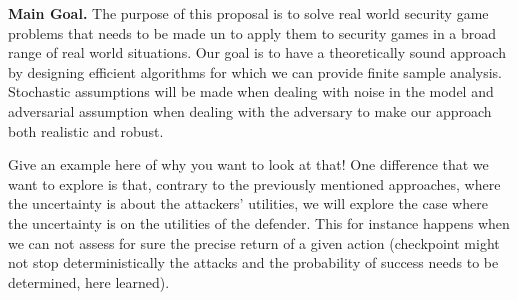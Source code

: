 

\textbf{Main Goal.} The purpose of this proposal is to solve real world security game problems that needs to be made un
to apply them to security games in a broad range of real world situations.
Our goal is to have a theoretically sound approach by designing efficient algorithms for which we can provide finite sample analysis.
Stochastic assumptions will be made when dealing with noise in the model and adversarial assumption when dealing with the adversary to make our approach both realistic and robust.

Give an example here of why you want to look at that!
One difference that we want to explore is that, contrary to the previously mentioned approaches, where the uncertainty is  about the attackers' utilities, we will explore the case where the uncertainty is on the utilities of the defender. This for instance happens when we can not assess for sure the precise return of a given action (checkpoint might not stop deterministically the attacks and the probability of success needs to be determined, here learned).





